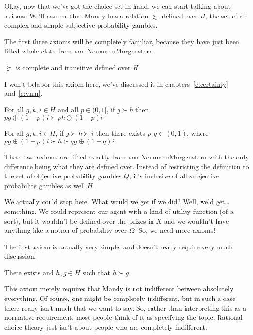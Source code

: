 Okay, now that we've got the choice set in hand, we can start talking about axioms. We'll assume that Mandy has a relation $\succsim$ defined over $H$, the set of all complex and simple subjective probability gambles.

The first three axioms will be completely familiar, because they have just been lifted whole cloth from von Neumann\breakslash Morgenstern. 

\begin{definition}[Axiom 1]
$\succsim$ is complete and transitive defined over $H$
\end{definition}

I won't belabor this axiom here, we've discussed it in chapters~\ref{c:certainty} and~\ref{c:vnm}.  

\begin{definition}
For all $g, h, i \in H$ and all $p \in (0,1]$, if $g \succ h$ then $p g \oplus (1-p) i \succ p h \oplus (1-p) i$
\end{definition}

\begin{definition}
For all $g, h, i \in H$, if $g \succ h \succ i$ then there exists $p, q \in (0,1)$, where $p g \oplus (1-p) i \succ h \succ q g \oplus (1-q) i$
\end{definition}

These two axioms are lifted exactly from von Neumann\breakslash Morgenstern with the only difference being what they are defined over.  Instead of restricting the definition to the set of objective probability gambles $Q$, it's inclusive of all subjective probability gambles as well $H$. 

We actually could stop here.  What would we get if we did?  Well, we'd get\dots something.  We could represent our agent with a kind of utility function (of a sort), but it wouldn't be defined over the prizes in $X$ and we wouldn't have anything like a notion of probability over $\Omega$.  So, we need more axioms!

The first axiom is actually very simple, and doesn't really require very much discussion.
\begin{definition}
There exists and $h, g \in H$ such that $h \succ g$
\end{definition}
This axiom merely requires that Mandy is not indifferent between absolutely everything.  Of course, one might be completely indifferent, but in such a case there really isn't much that we want to say.  So, rather than interpreting this as a normative requirement, most people think of it as specifying the topic.  Rational choice theory just isn't about people who are completely indifferent.


